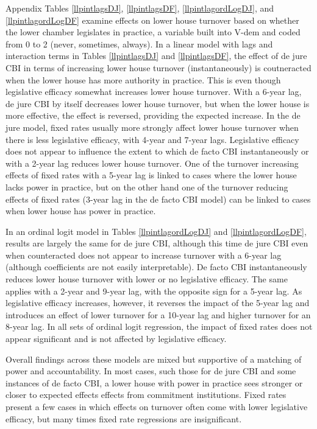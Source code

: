\documentclass{article}
\begin{document}
    Appendix Tables \ref{llpintlagsDJ}, \ref{llpintlagsDF}, \ref{llpintlagordLogDJ}, and \ref{llpintlagordLogDF} examine effects on lower house turnover based on whether the lower chamber legislates in practice, a variable built into V-dem and coded from 0 to 2 (never, sometimes, always). In a linear model with lags and interaction terms in Tables \ref{llpintlagsDJ} and \ref{llpintlagsDF}, the effect of de jure CBI in terms of increasing lower house turnover (instantaneously) is coutneracted when the lower house has more authority in practice. This is even though legislative efficacy somewhat increases lower house turnover. With a 6-year lag, de jure CBI by itself decreases lower house turnover, but when the lower house is more effective, the effect is reversed, providing the expected increase. In the de jure model, fixed rates usually more strongly affect lower house turnover when there is less legislative efficacy, with 4-year and 7-year lags. Legislative efficacy does not appear to influence the extent to which de facto CBI instantaneously or with a 2-year lag reduces lower house turnover. One of the turnover increasing effects of fixed rates with a 5-year lag is linked to cases where the lower house lacks power in practice, but on the other hand one of the turnover reducing effects of fixed rates (3-year lag in the de facto CBI model) can be linked to cases when lower house has power in practice.

    In an ordinal logit model in Tables \ref{llpintlagordLogDJ} and \ref{llpintlagordLogDF}, results are largely the same for de jure CBI, although this time de jure CBI even when counteracted does not appear to increase turnover with a 6-year lag (although coefficients are not easily interpretable). De facto CBI instantaneously reduces lower house turnover with lower or no legislative efficacy. The same applies with a 2-year and 9-year lag, with the opposite sign for a 5-year lag. As legislative efficacy increases, however, it reverses the impact of the 5-year lag and introduces an effect of lower turnover for a 10-year lag and higher turnover for an 8-year lag. In all sets of ordinal logit regression, the impact of fixed rates does not appear significant and is not affected by legislative efficacy.

    Overall findings across these models are mixed but supportive of a matching of power and accountability. In most cases, such those for de jure CBI and some instances of de facto CBI, a lower house with power in practice sees stronger or closer to expected effects effects from commitment institutions. Fixed rates present a few cases in which effects on turnover often come with lower legislative efficacy, but many times fixed rate regressions are insignificant.
    
\end{document}
